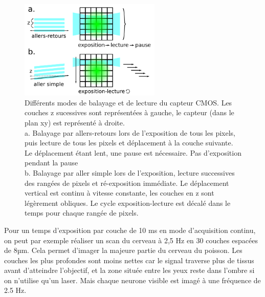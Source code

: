 \begin{figure}
\centering
\includegraphics[width=0.6\textwidth]{./files/schema_balayage.svg.png}
\caption{Différents modes de balayage et de lecture du capteur CMOS. Les couches z sucessives sont représentées à gauche, le capteur (dans le plan xy) est représenté à droite.\\
a. Balayage par allers-retours lors de l'exposition de tous les pixels, puis lecture de tous les pixels et déplacement à la couche suivante. Le déplacement étant lent, une pause est nécessaire. Pas d'exposition pendant la pause\\
b. Balayage par aller simple lors de l'exposition, lecture successives des rangées de pixels et ré-exposition immédiate. Le déplacement vertical est continu à vitesse constante, les couches en z sont légèrement obliques. Le cycle exposition-lecture est décalé dans le temps pour chaque rangée de pixels.}
\end{figure}

Pour un temps d'exposition par couche de 10 ms en mode d'acquisition continu, on peut par exemple réaliser un scan du cerveau à 2,5 Hz en 30 couches espacées de 8µm. Cela permet d'imager la majeure partie du cerveau du poisson. Les couches les plus profondes sont moins nettes car le signal traverse plus de tissus avant d'atteindre l'objectif, et la zone située entre les yeux reste dans l'ombre si on n'utilise qu'un laser. Mais chaque neurone visible est imagé à une fréquence de 2.5 Hz.







